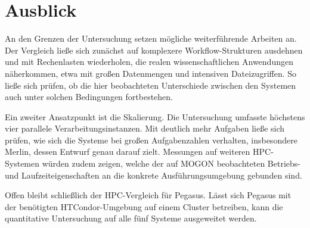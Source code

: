\section{Ausblick}
\label{sec:conclusion:ausblick}

An den Grenzen der Untersuchung setzen mögliche weiterführende
Arbeiten an. Der Vergleich ließe sich zunächst auf komplexere
Workflow-Strukturen ausdehnen und mit Rechenlasten wiederholen, die
realen wissenschaftlichen Anwendungen näherkommen, etwa mit großen
Datenmengen und intensiven Dateizugriffen. So ließe sich prüfen, ob
die hier beobachteten Unterschiede zwischen den Systemen auch unter
solchen Bedingungen fortbestehen.

Ein zweiter Ansatzpunkt ist die Skalierung. Die Untersuchung
umfasste höchstens vier parallele Verarbeitungsinstanzen. Mit
deutlich mehr Aufgaben ließe sich prüfen, wie sich die Systeme bei
großen Aufgabenzahlen verhalten, insbesondere Merlin, dessen Entwurf
genau darauf zielt. Messungen auf weiteren HPC-Systemen würden
zudem zeigen, welche der auf MOGON beobachteten Betriebs- und
Laufzeiteigenschaften an die konkrete Ausführungsumgebung gebunden
sind.

Offen bleibt schließlich der HPC-Vergleich für Pegasus. Lässt sich
Pegasus mit der benötigten HTCondor-Umgebung auf einem Cluster
betreiben, kann die quantitative Untersuchung auf alle fünf Systeme
ausgeweitet werden.